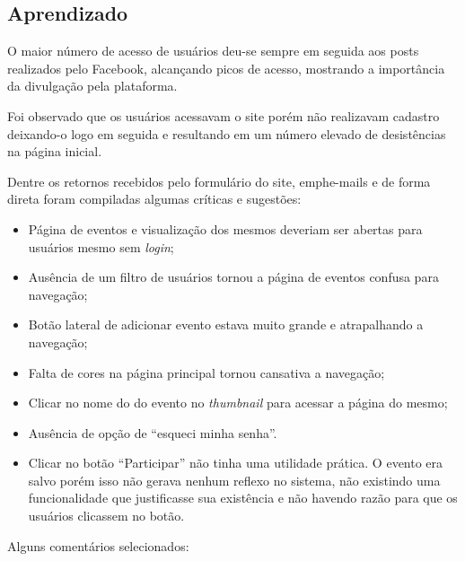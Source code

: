 \subsection{Aprendizado}
\par O maior número de acesso de usuários deu-se sempre em seguida aos posts realizados pelo Facebook, alcançando picos de acesso, mostrando a importância da divulgação pela plataforma.
\par Foi observado que os usuários acessavam o site porém não realizavam cadastro deixando-o logo em seguida e resultando em um número elevado de desistências na página inicial.
\par Dentre os retornos recebidos pelo formulário do site, emph{e-mails} e de forma direta foram compiladas algumas críticas e sugestões:
\begin{itemize}
\item Página de eventos e visualização dos mesmos deveriam ser abertas para usuários mesmo sem \emph{login};
\item Ausência de um filtro de usuários tornou a página de eventos confusa para navegação;
\item Botão lateral de adicionar evento estava muito grande e atrapalhando a navegação;
\item Falta de cores na página principal tornou cansativa a navegação;
\item Clicar no nome do do evento no \emph{thumbnail} para acessar a página do mesmo;
\item Ausência de opção de ``esqueci minha senha''.
\item Clicar no botão ``Participar'' não tinha uma utilidade prática. O evento era salvo porém isso não gerava nenhum reflexo no sistema, não existindo uma funcionalidade que justificasse sua existência e não havendo razão para que os usuários clicassem no botão.
\end{itemize}
\par Alguns comentários selecionados:
